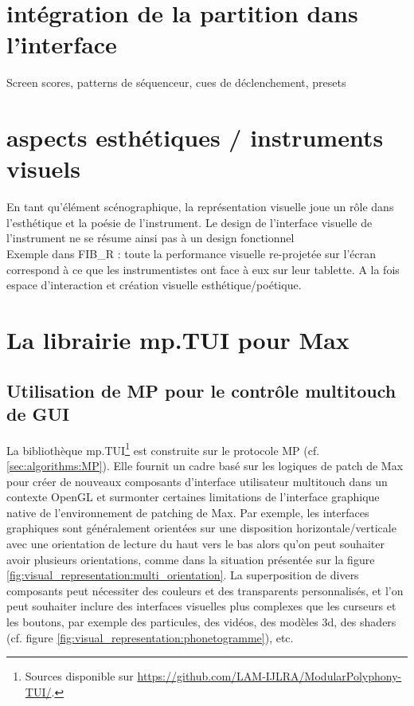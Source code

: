 \section{intégration de la partition dans l'interface}
Screen scores, patterns de séquenceur, cues de déclenchement, presets

\section{aspects esthétiques / instruments visuels}
En tant qu'élément scénographique, la représentation visuelle joue un rôle dans l'esthétique et la poésie de l'instrument. Le design de l'interface visuelle de l'instrument ne se résume ainsi pas à un design fonctionnel\\

Exemple dans FIB\_R : toute la performance visuelle re-projetée sur l'écran correspond à ce que les instrumentistes ont face à eux sur leur tablette. A la fois espace d'interaction et création visuelle esthétique/poétique.



\section{La librairie mp.TUI pour Max}

\subsection{Utilisation de MP pour le contrôle multitouch de GUI}

La bibliothèque mp.TUI\footnote{Sources disponible sur \url{https://github.com/LAM-IJLRA/ModularPolyphony-TUI/}.} est construite sur le protocole MP (cf. \ref{sec:algorithms:MP}). Elle fournit un cadre basé sur les logiques de patch de Max pour créer de nouveaux composants d'interface utilisateur multitouch dans un contexte OpenGL et surmonter certaines limitations de l'interface graphique native de l'environnement de patching de Max. Par exemple, les interfaces graphiques sont généralement orientées sur une disposition horizontale/verticale avec une orientation de lecture du haut vers le bas alors qu'on peut souhaiter avoir plusieurs orientations, comme dans la situation présentée sur la figure \ref{fig:visual_representation:multi_orientation}. La superposition de divers composants peut nécessiter des couleurs et des transparents personnalisés, et l'on peut souhaiter inclure des interfaces visuelles plus complexes que les curseurs et les boutons, par exemple des particules, des vidéos, des modèles 3d, des shaders (cf. figure \ref{fig:visual_representation:phonetogramme}), etc.

